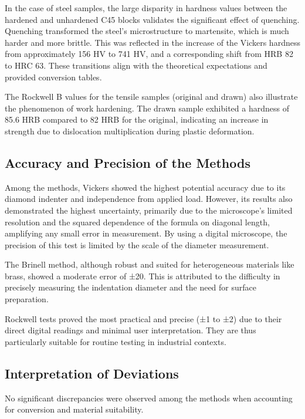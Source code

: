 \documentclass[a4paper]{article}
\begin{document}
  In the case of steel samples, the large disparity in hardness values between
  the hardened and unhardened C45 blocks validates the significant effect of
  quenching. Quenching transformed the steel’s microstructure to martensite,
  which is much harder and more brittle\cite{DewulfMaterials}. This was
  reflected in the increase of the Vickers hardness from approximately 156 HV to
  741 HV, and a corresponding shift from HRB 82 to HRC 63. These transitions
  align with the theoretical expectations and provided conversion
  tables\cite{ASTME140}.
  
  The Rockwell B values for the tensile samples (original and drawn) also illustrate the phenomenon of work hardening. The drawn sample exhibited a hardness of 85.6 HRB compared to 82 HRB for the original, indicating an increase in strength due to dislocation multiplication during plastic deformation.
  
  \subsection{Accuracy and Precision of the Methods}
  
  Among the methods, Vickers showed the highest potential accuracy due to its
  diamond indenter and independence from applied load. However, its results also
  demonstrated the highest uncertainty, primarily due to the microscope's
  limited resolution and the squared dependence of the formula on diagonal
  length, amplifying any small error in measurement. By using a digital
  microscope, the precision of this test is limited by the scale of the diameter
  measurement.
  
  The Brinell method, although robust and suited for heterogeneous materials like brass, showed a moderate error of ±20. This is attributed to the difficulty in precisely measuring the indentation diameter and the need for surface preparation.
  
  Rockwell tests proved the most practical and precise (±1 to ±2) due to their direct digital readings and minimal user interpretation\cite{ASTME18}. They are thus particularly suitable for routine testing in industrial contexts.
  
  \subsection{Interpretation of Deviations}
  
  No significant discrepancies were observed among the methods when accounting
  for conversion and material suitability. 
  \newpage
  
\end{document}
